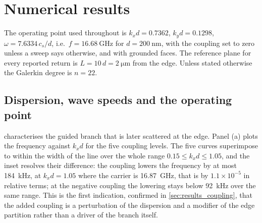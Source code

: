 \section{Numerical results}
\label{sec:results}

The operating point used throughout is
$k_xd=0.7362$, $k_yd=0.1298$, $\omega=7.6334\,c_s/d$, i.e.\
$f=\SI{16.68}{\giga\hertz}$ for $d=\SI{200}{\nano\metre}$, with the coupling
set to zero unless a sweep says otherwise, and with grounded faces.  The
reference plane for every reported return is $L=10\,d=\SI{2}{\micro\metre}$ from
the edge.  Unless stated otherwise the Galerkin degree is $n=22$.

\subsection{Dispersion, wave speeds and the operating point}
\label{sec:results_dispersion}
\label{sec:results_scope}

 characterises the guided branch that is later scattered at the
edge.  Panel (a) plots the frequency against $k_xd$ for the five coupling
levels.  The five curves superimpose to within the width of the line over the
whole range $0.15\le k_xd\le1.05$, and the inset resolves their difference: the
coupling lowers the frequency by at most \SI{184}{\kilo\hertz}, at
$k_xd=1.05$ where the carrier is \SI{16.87}{\giga\hertz}, that is by
$1.1\times10^{-5}$ in relative terms; at the negative coupling the lowering
stays below \SI{92}{\kilo\hertz} over the same range.  This is the first indication, confirmed in \cref{sec:results_coupling},
that the added coupling is a perturbation of the dispersion and a modifier of
the edge partition rather than a driver of the branch itself.

